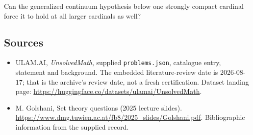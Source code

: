 \documentclass[11pt,a4paper]{article}
\begin{document}
Can the generalized continuum hypothesis below one strongly compact cardinal force it to hold at all larger cardinals as well?

\subsection{Sources}

{\small

\begin{itemize}

\item[\hypertarget{source:statement:1}{S1}] ULAM.AI, \emph{UnsolvedMath}, supplied \texttt{problems.json}, catalogue entry, statement and background. The embedded literature-review date is 2026-08-17; that is the archive’s review date, not a fresh certification. Dataset landing page: \url{https://huggingface.co/datasets/ulamai/UnsolvedMath}.

\item[\hypertarget{source:statement:2}{S2}] M. Golshani, Set theory questions (2025 lecture slides). \url{https://www.dmg.tuwien.ac.at/fb8/2025_slides/Golshani.pdf}. Bibliographic information from the supplied record.

\end{itemize}

}

\label{end:statement}
\end{document}
